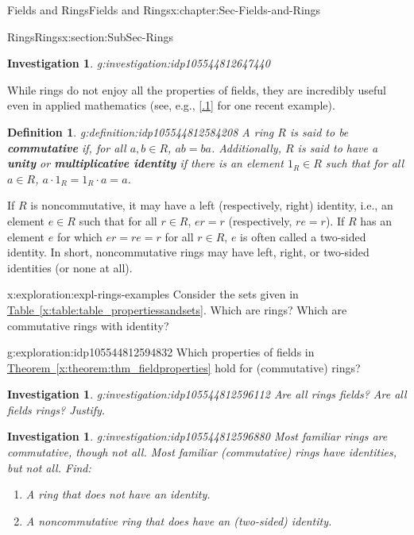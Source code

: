 \documentclass[oneside,10pt,]{book}
\newcommand{\xreffont}{\relax}
\newcommand{\terminology}[1]{\textbf{#1}}
\numberwithin{equation}{section}
\newtheorem{definition}[theorem]{Definition}
\newtheorem{investigation}[theorem]{Investigation}
\begin{document}
\begin{chapterptx}{Fields and Rings}{}{Fields and Rings}{}{}{x:chapter:Sec-Fields-and-Rings}
\begin{sectionptx}{Rings}{}{Rings}{}{}{x:section:SubSec-Rings}
\begin{investigation}{}{g:investigation:idp105544812647440}
\end{investigation}%
While rings do not enjoy all the properties of fields, they are incredibly useful even in applied mathematics (see, e.g., \hyperlink{x:biblio:Curto2013}{[{\xreffont 2.2.1}]} for one recent example).%
\begin{definition}{}{g:definition:idp105544812584208}%
%
%
%
A ring \(R\) is said to be \terminology{commutative} if, for all \(a,b\in R\), \(ab = ba\). Additionally, \(R\) is said to have a \terminology{unity} or \terminology{multiplicative identity} if there is an element \(1_R\in R\) such that for all \(a\in R\), \(a \cdot 1_R = 1_R \cdot a= a\).%
\end{definition}
If \(R\) is noncommutative, it may have a left (respectively, right) identity, i.e., an element \(e\in R\) such that for all \(r\in R\), \(er = r\) (respectively, \(re = r\)). If \(R\) has an element \(e\) for which \(er = re = r\) for all \(r\in R\), \(e\) is often called a two-sided identity. In short, noncommutative rings may have left, right, or two-sided identities (or none at all).%
\begin{exploration}{}{x:exploration:expl-rings-examples}%
Consider the sets given in \hyperref[x:table:table_propertiessandsets]{Table~{\xreffont\ref{x:table:table_propertiessandsets}}}. Which are rings? Which are commutative rings with identity?%
\end{exploration}%
\begin{exploration}{}{g:exploration:idp105544812594832}%
Which properties of fields in \hyperref[x:theorem:thm_fieldproperties]{Theorem~{\xreffont\ref{x:theorem:thm_fieldproperties}}} hold for (commutative) rings?%
\end{exploration}%
\begin{investigation}{}{g:investigation:idp105544812596112}%
Are all rings fields? Are all fields rings? Justify.%
\end{investigation}%
\begin{investigation}{}{g:investigation:idp105544812596880}%
Most familiar rings are commutative, though not all. Most familiar (commutative) rings have identities, but not all. Find:%
\begin{enumerate}
\item{}A ring that does not have an identity\footnotemark{}.%
\item{}A noncommutative ring that \emph{does} have an (two-sided) identity.%
\end{enumerate}

\end{investigation}
\end{sectionptx}
\end{chapterptx}
\end{document}
